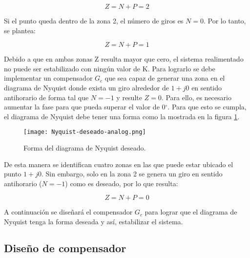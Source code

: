 \begin{equation*}
	Z = N + P = 2
\end{equation*}


Si el punto queda dentro de la zona 2, el número de giros es $N=0$. Por lo tanto, se plantea:

\begin{equation*}
	Z = N + P = 1
\end{equation*}

Debido a que en ambas zonas Z resulta mayor que cero, el sistema realimentado no puede ser estabilizado con ningún valor de K. Para lograrlo se debe implementar un compensador $G_c$ que sea capaz de generar una zona en el diagrama de Nyquist donde exista un giro alrededor de $1 + j0$ en sentido antihorario de forma tal que $N=-1$ y resulte $Z=0$. Para ello, es necesario aumentar la fase para que pueda superar el valor de 0$\mathrm{{}^\circ}$. Para que esto se cumpla, el diagrama de Nyquist debe tener una forma como la  mostrada en la figura \ref{fig:nyquist-deseado-analog}.

\begin{figure}[H]
	\centering
	\texttt{[image: Nyquist-deseado-analog.png]}
	\caption{Forma del diagrama de Nyquist deseado.}
	\label{fig:nyquist-deseado-analog}
\end{figure}

De esta manera se identifican cuatro zonas en las que puede estar ubicado el punto $1+j0$. Sin embargo, solo en la zona 2 se genera un giro en sentido antihorario ($N=-1$) como es deseado, por lo que resulta:

\begin{equation*}
	Z = N + P = 0
\end{equation*}


A continuación se diseñará el compensador $G_c$ para lograr que el diagrama de Nyquist tenga la forma deseada y así, estabilizar el sistema.


\subsection{Diseño de compensador}

